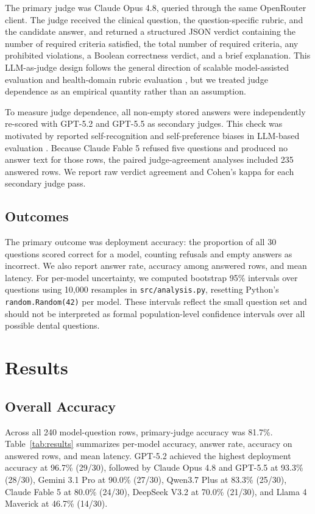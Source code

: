 \documentclass[11pt]{article}
\begin{document}
The primary judge was Claude Opus 4.8, queried through the same OpenRouter client.
The judge received the clinical question, the question-specific rubric, and the candidate answer, and returned a structured JSON verdict containing the number of required criteria satisfied, the total number of required criteria, any prohibited violations, a Boolean correctness verdict, and a brief explanation.
This LLM-as-judge design follows the general direction of scalable model-assisted evaluation \cite{zheng2023judge} and health-domain rubric evaluation \cite{arora2025healthbench}, but we treated judge dependence as an empirical quantity rather than an assumption.

To measure judge dependence, all non-empty stored answers were independently re-scored with GPT-5.2 and GPT-5.5 as secondary judges.
This check was motivated by reported self-recognition and self-preference biases in LLM-based evaluation \cite{panickssery2024selfrecognition,wataoka2024selfpreference}.
Because Claude Fable 5 refused five questions and produced no answer text for those rows, the paired judge-agreement analyses included 235 answered rows.
We report raw verdict agreement and Cohen's kappa for each secondary judge pass.

\subsection{Outcomes}

The primary outcome was deployment accuracy: the proportion of all 30 questions scored correct for a model, counting refusals and empty answers as incorrect.
We also report answer rate, accuracy among answered rows, and mean latency.
For per-model uncertainty, we computed bootstrap 95\% intervals over questions using 10,000 resamples in \texttt{src/analysis.py}, resetting Python's \texttt{random.Random(42)} per model.
These intervals reflect the small question set and should not be interpreted as formal population-level confidence intervals over all possible dental questions.

\section{Results}

\subsection{Overall Accuracy}

Across all 240 model-question rows, primary-judge accuracy was 81.7\%.
Table~\ref{tab:results} summarizes per-model accuracy, answer rate, accuracy on answered rows, and mean latency.
GPT-5.2 achieved the highest deployment accuracy at 96.7\% (29/30), followed by Claude Opus 4.8 and GPT-5.5 at 93.3\% (28/30), Gemini 3.1 Pro at 90.0\% (27/30), Qwen3.7 Plus at 83.3\% (25/30), Claude Fable 5 at 80.0\% (24/30), DeepSeek V3.2 at 70.0\% (21/30), and Llama 4 Maverick at 46.7\% (14/30).
\end{document}
